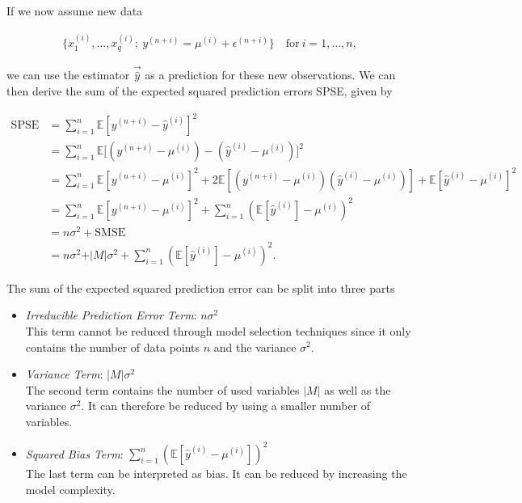 \documentclass[10pt,a4paper]{report}
\begin{document}
If we now assume new data 

\begin{align} \label{eq:new_data}
	\{ x^{(i)}_{1}, \dots, x^{(i)}_{q}; \ y^{(n+i)} = \mu^{(i)} + \epsilon^{(n+i)}\} \quad \text{for} \ i = 1, \dots, n,
\end{align}

we can use the estimator $\vec{\hat{y}}$ as a prediction for these new observations. We can then derive the sum of the expected squared prediction errors SPSE, given by

\begin{equation}
\begin{split}
	\text{SPSE} &= \sum_{i=1}^{n} \mathbb{E}[y^{(n+i)} - \hat y^{(i)}]^2 \\ 
				&= \sum_{i=1}^{n} \mathbb{E}\big[(y^{(n+i)} - \mu^{(i)}) - (\hat y^{(i)} - \mu^{(i)})\big]^2 \\ 
				&= \sum_{i=1}^{n} \mathbb{E}[y^{(n+i)} - \mu^{(i)}]^2 + 2\mathbb{E}[(y^{(n+i)} - \mu^{(i)})(\hat y^{(i)} - \mu^{(i)})] + \mathbb{E}[\hat y^{(i)} - \mu^{(i)}]^2 \\
				&= \sum_{i=1}^{n}\mathbb{E}[y^{(n+i)} - \mu^{(i)}]^2 + \sum_{i=1}^{n}(\mathbb{E}[\hat y^{(i)}] - \mu^{(i)})^2 \\ 
				&= n\sigma^2 + \text{SMSE} \\ 
				&= n\sigma^2 + \vert M \vert \sigma^2 + \sum_{i=1}^{n}(\mathbb{E}[\hat y^{(i)}] - \mu^{(i)})^2.
\end{split}
\end{equation}

The sum of the expected squared prediction error can be split into three parts

\begin{itemize}
	\item \emph{Irreducible Prediction Error Term}: $n\sigma^2$ \\
	This term cannot be reduced through model selection techniques since it only contains the number of data points $n$ and the variance $\sigma^2$.

	\item \emph{Variance Term}: $\vert M \vert \sigma^2$ \\
	The second term contains the number of used variables $\vert M \vert$ as well as the variance $\sigma^2$. It can therefore be reduced by using a smaller number of variables.
	
	\item \emph{Squared Bias Term}: $\sum_{i=1}^{n} (\mathbb{E}[\hat y^{(i)} - \mu^{(i)}])^2$\\
	The last term can be interpreted as bias. It can be reduced by increasing the model complexity.
\end{itemize}
\end{document}
